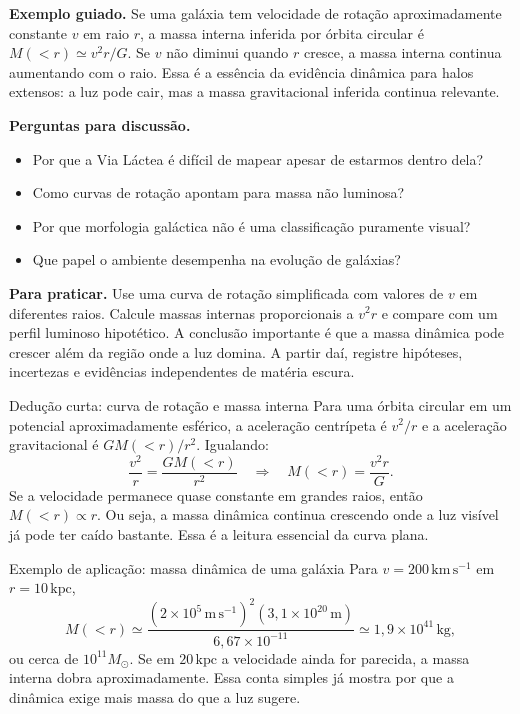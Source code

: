 \documentclass[11pt,a4paper]{article}
\begin{document}
\textbf{Exemplo guiado.} Se uma galáxia tem velocidade de rotação aproximadamente constante $v$ em raio $r$, a massa interna inferida por órbita circular é $M(<r)\simeq v^2r/G$. Se $v$ não diminui quando $r$ cresce, a massa interna continua aumentando com o raio. Essa é a essência da evidência dinâmica para halos extensos: a luz pode cair, mas a massa gravitacional inferida continua relevante.

\textbf{Perguntas para discussão.}
\begin{itemize}
\item Por que a Via Láctea é difícil de mapear apesar de estarmos dentro dela?
\item Como curvas de rotação apontam para massa não luminosa?
\item Por que morfologia galáctica não é uma classificação puramente visual?
\item Que papel o ambiente desempenha na evolução de galáxias?
\end{itemize}

\textbf{Para praticar.} Use uma curva de rotação simplificada com valores de $v$ em diferentes raios. Calcule massas internas proporcionais a $v^2r$ e compare com um perfil luminoso hipotético. A conclusão importante é que a massa dinâmica pode crescer além da região onde a luz domina. A partir daí, registre hipóteses, incertezas e evidências independentes de matéria escura.

\begin{lessonblock}[borderline west={2pt}{0pt}{astroGold}]{Dedução curta: curva de rotação e massa interna}
Para uma órbita circular em um potencial aproximadamente esférico, a aceleração centrípeta é $v^2/r$ e a aceleração gravitacional é $GM(<r)/r^2$. Igualando:
\[
\frac{v^2}{r}=\frac{GM(<r)}{r^2}
\quad\Rightarrow\quad
M(<r)=\frac{v^2r}{G}.
\]
Se a velocidade permanece quase constante em grandes raios, então $M(<r)\propto r$. Ou seja, a massa dinâmica continua crescendo onde a luz visível já pode ter caído bastante. Essa é a leitura essencial da curva plana.
\end{lessonblock}

\begin{lessonblock}{Exemplo de aplicação: massa dinâmica de uma galáxia}
Para $v=200\,\mathrm{km\,s^{-1}}$ em $r=10\,\mathrm{kpc}$,
\[
M(<r)\simeq\frac{(2\times10^5\,\mathrm{m\,s^{-1}})^2(3{,}1\times10^{20}\,\mathrm{m})}{6{,}67\times10^{-11}}
\simeq1{,}9\times10^{41}\,\mathrm{kg},
\]
ou cerca de $10^{11}M_\odot$. Se em $20\,\mathrm{kpc}$ a velocidade ainda for parecida, a massa interna dobra aproximadamente. Essa conta simples já mostra por que a dinâmica exige mais massa do que a luz sugere.
\end{lessonblock}
\end{document}
